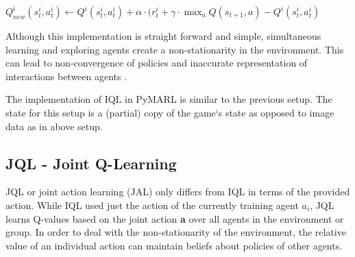 \begin{center}

$Q^{\text {i}}_{new}\left(s^{i}_{t}, a^{i}_{t}\right) 
\leftarrow 
Q^{i}\left(s^{i}_{t}, a^{i}_{t}\right)
+
\alpha
\cdot
(r^{i}_{t}+\gamma\cdot\max _{a} Q\left(s_{t+1}, a\right)
-
Q^{i}\left(s^{i}_{t}, a^{i}_{t}\right)
$
	
\end{center}

Although this implementation is straight forward and simple, simultaneous learning and exploring agents create a non-stationarity in the environment. This can lead to non-convergence of policies and inaccurate representation of interactions between agents \cite{rashid2018qmix}.

The implementation of IQL in PyMARL is similar to the previous setup. The state for this setup is a (partial) copy of the game`s state as opposed to image data as in above setup.

%
%
%
%	
%	
%
%
% 
% 
%
%


\subsection{JQL - Joint Q-Learning}
JQL or joint action learning (JAL) only differs from IQL in terms of the provided action. While IQL used just the action of the currently training agent $a_{i}$, JQL learns Q-values based on the joint action \textbf{a} over all agents in the environment or group. In order to deal with the non-stationarity of the environment, the relative value of an individual action can maintain beliefs about policies of other agents.

